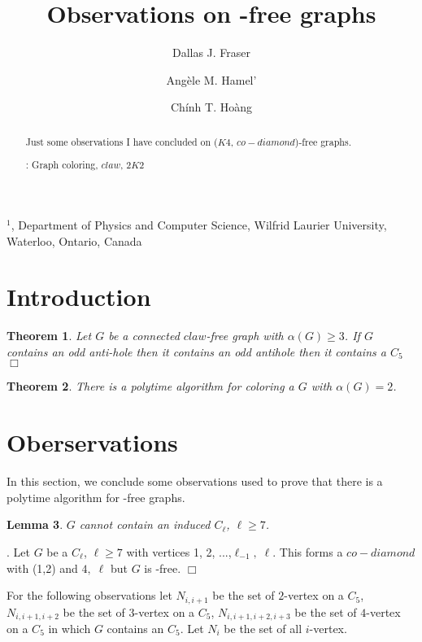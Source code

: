 \documentclass[12pt]{article}
\title{Observations on {\KCD}-free graphs}
\author{
	Dallas J. Fraser\inst{1}
	\and Ang\`ele M. Hamel'\inst{1}
	\and Ch\'inh T. Ho\`ang\inst{1}
}
\newtheorem{Theorem}{Theorem}[section]
\newtheorem{Lemma}[Theorem]{Lemma}
\def\inst#1{$^{#1}$}
\def\KCD{($K4$, $co-diamond$)}
\def\VTWO{$N_{i , i+1}$}
\def\VTHREE{$N_{i , i+1, i+2}$}
\def\VFOUR{$N_{i , i+1, i+2, i+3}$}
\begin{document}
\maketitle

\begin{center}
{\footnotesize

\inst{1}, Department of Physics and Computer Science, Wilfrid Laurier
University, \\Waterloo, Ontario, Canada}

\end{center}

\begin{abstract}
Just some observations I have concluded on {\KCD}-free graphs.

: Graph coloring, $claw$, $2K2$
\end{abstract}


\section{Introduction}\label{sec:intro}

\begin{Theorem}\label{thm:ben-rebea}
Let $G$ be a connected $claw$-free graph with $\alpha(G) \geq 3$. If $G$ contains an odd anti-hole then it contains an odd antihole then it contains a $C_5$ $\Box$
\end{Theorem}

\begin{Theorem}\label{thm:alpha-two-poly}
There is a polytime algorithm for coloring a $G$ with $\alpha(G) =2$.
 \end{Theorem}

\section{Oberservations}\label{sec:observations}
In this section, we conclude some observations used to prove that there is a polytime algorithm for {\CCD}-free graphs.
\begin{Lemma}\label{lem:odd-hole-free}
$G$ cannot contain an induced $C_\ell$, $\ell \geq 7$.
\end{Lemma}
. Let $G$ be a $C_\ell$, $\ell \geq 7$ with vertices 1, 2, ...,$\ell_{-1},\; \ell$. This forms a $co-diamond$ with (1,2) and $4,\; \ell$  but $G$ is {\CCD}-free. $\Box$

For the following observations let {\VTWO} be the set of $2$-vertex on a $C_5$, {\VTHREE} be the set of $3$-vertex on a $C_5$, {\VFOUR} be the set of $4$-vertex on a $C_5$ in which $G$ contains an $C_5$. Let $N_i$ be the set of all $i$-vertex. 
\end{document}
